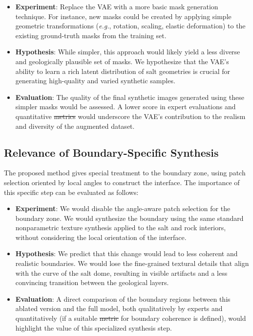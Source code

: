\documentclass{ieeeaccess}
\makeatletter
\providecommand{\DIFaddtex}[1]{{\protect\color{blue}\uwave{#1}}} %
\providecommand{\DIFdeltex}[1]{{\protect\color{red}\sout{#1}}} %
\providecommand{\DIFaddbegin}{} %
\providecommand{\DIFaddend}{} %
\providecommand{\DIFdelbegin}{} %
\providecommand{\DIFdelend}{} %
\providecommand{\DIFadd}[1]{\texorpdfstring{\DIFaddtex{#1}}{#1}} %
\providecommand{\DIFdel}[1]{\texorpdfstring{\DIFdeltex{#1}}{}} %
\newcommand{\DIFscaledelfig}{0.5}
\newlength{\DIFdelgraphicswidth} %
\newlength{\DIFdelgraphicsheight} %
\newcommand{\DIFaddincludegraphics}[2][]{{\color{blue}\fbox{\DIFOincludegraphics[#1]{#2}}}} %
\newcommand{\DIFdelincludegraphics}[2][]{%
\sbox{\DIFdelgraphicsbox}{\DIFOincludegraphics[#1]{#2}}%
\settoboxwidth{\DIFdelgraphicswidth}{\DIFdelgraphicsbox} %
\settoboxtotalheight{\DIFdelgraphicsheight}{\DIFdelgraphicsbox} %
\scalebox{\DIFscaledelfig}{%
\parbox[b]{\DIFdelgraphicswidth}{\usebox{\DIFdelgraphicsbox}\\[-\baselineskip] \rule{\DIFdelgraphicswidth}{0em}}\llap{\resizebox{\DIFdelgraphicswidth}{\DIFdelgraphicsheight}{%
\setlength{\unitlength}{\DIFdelgraphicswidth}%
\begin{picture}(1,1)%
\thicklines\linethickness{2pt} %
{\color[rgb]{1,0,0}\put(0,0){\framebox(1,1){}}}%
{\color[rgb]{1,0,0}\put(0,0){\line( 1,1){1}}}%
{\color[rgb]{1,0,0}\put(0,1){\line(1,-1){1}}}%
\end{picture}%
}\hspace*{3pt}}} %
} %
\DeclareRobustCommand{\DIFaddbegin}{\DIFOaddbegin \let\includegraphics\DIFaddincludegraphics} %
\DeclareRobustCommand{\DIFaddend}{\DIFOaddend \let\includegraphics\DIFOincludegraphics} %
\DeclareRobustCommand{\DIFdelbegin}{\DIFOdelbegin \let\includegraphics\DIFdelincludegraphics} %
\DeclareRobustCommand{\DIFdelend}{\DIFOaddend \let\includegraphics\DIFOincludegraphics} %
\let\sout@orig\sout %
\renewcommand{\sout}[1]{\ifmmode\text{\sout@orig{\ensuremath{#1}}}\else\sout@orig{#1}\fi} %
\makeatother
\begin{document}
\begin{itemize}
    \item \textbf{Experiment}: Replace the VAE with a more basic mask generation technique. For instance, new masks could be created by applying simple geometric transformations (\emph{e.g.}, rotation, scaling, elastic deformation) to the existing ground-truth masks from the training set.
    \item \textbf{Hypothesis}: While simpler, this approach would likely yield a less diverse and geologically plausible set of masks. We hypothesize that the VAE's ability to learn a rich latent distribution of salt geometries is crucial for generating high-quality and varied synthetic samples.
    \item \textbf{Evaluation}: The quality of the final synthetic images generated using these simpler masks would be assessed. A lower score in expert evaluations and quantitative \DIFdelbegin \DIFdel{metrics }\DIFdelend \DIFaddbegin \DIFadd{measures }\DIFaddend would underscore the VAE's contribution to the realism and diversity of the augmented dataset.
\end{itemize}

\subsection{Relevance of Boundary-Specific Synthesis}

The proposed method gives special treatment to the boundary zone, using patch selection oriented by local angles to construct the interface. The importance of this specific step can be evaluated as follows:

\begin{itemize}
    \item \textbf{Experiment}: We would disable the angle-aware patch selection for the boundary zone. We would synthesize the boundary using the same standard nonparametric texture synthesis applied to the salt and rock interiors, without considering the local orientation of the interface.
    \item \textbf{Hypothesis}: We predict that this change would lead to less coherent and realistic boundaries. We would lose the fine-grained textural details that align with the curve of the salt dome, resulting in visible artifacts and a less convincing transition between the geological layers.
    \item \textbf{Evaluation}: A direct comparison of the boundary regions between this ablated version and the full model, both qualitatively by experts and quantitatively (if a suitable \DIFdelbegin \DIFdel{metric }\DIFdelend \DIFaddbegin \DIFadd{measure }\DIFaddend for boundary coherence is defined), would highlight the value of this specialized synthesis step.
\end{itemize}
\end{document}
